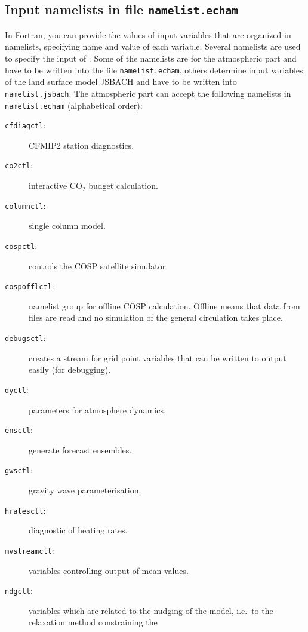 \subsection{Input namelists in file {\tt namelist.echam}}
  In Fortran, you can provide the values of input variables that are
  organized in
  namelists, specifying name and value of each variable. Several
  namelists are used to specify the input of \echam. Some of the
  namelists are for the atmospheric part and have to be written into
  the file {\tt namelist.echam}, others determine input variables of
  the land surface model JSBACH and have to be written into {\tt
    namelist.jsbach}. The atmospheric part can accept the following
  namelists in {\tt namelist.echam} (alphabetical order):

\begin{description}
  \item[{\tt cfdiagctl}:] CFMIP2 station
    diagnostics. 
  \item[{\tt co2ctl}:] interactive CO$_2$
    budget calculation. 
  \item[{\tt columnctl}:] single column model. 
  \item[{\tt cospctl}:] controls the COSP
    satellite simulator 
  \item[{\tt cospofflctl}:] namelist
    group for offline COSP 
    calculation. Offline means that data from files are read and no
    simulation of the general circulation takes place.
  \item[{\tt debugsctl}:] creates a stream
    for grid point variables 
    that can be written to output easily (for debugging).
  \item[{\tt dyctl}:] parameters for
    atmosphere dynamics. 
  \item[{\tt ensctl}:] generate forecast ensembles.
  \item[{\tt gwsctl}:] gravity wave parameterisation.
  \item[{\tt hratesctl}:] diagnostic of
    heating rates. 
  \item[{\tt mvstreamctl}:] variables
    controlling output of mean 
    values.
  \item[{\tt ndgctl}:] variables which are
    related to the nudging of 
    the model, i.e.~to the relaxation method constraining the

\end{description}
